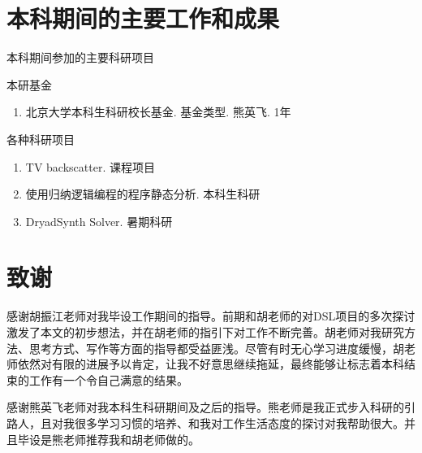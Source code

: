 \documentclass[UTF8,openany,AutoFakeBold,AutoFakeSlant,cs4size]{ctexbook}
\begin{document}
\clearpage
{}
{}
\small





\linespread{1}\selectfont
\normalsize
\chapter*{本科期间的主要工作和成果}

\noindent 本科期间参加的主要科研项目

\noindent 本研基金
\begin{enumerate}
	\item 北京大学本科生科研校长基金. 基金类型. 熊英飞. 1年
\end{enumerate}

\noindent 各种科研项目
\begin{enumerate}
	\item TV backscatter. 课程项目
	\item 使用归纳逻辑编程的程序静态分析. 本科生科研
	\item DryadSynth Solver. 暑期科研
\end{enumerate}



{
	\fancyhf{}
	\fancyfoot[CO,CE]{~\thepage~}
	\renewcommand{\headrulewidth}{0.7pt}
	\renewcommand{\footrulewidth}{0pt}
}
\fancyhf{}
\fancyfoot[CO,CE]{~\thepage~}
\renewcommand{\headrulewidth}{0.7pt}
\renewcommand{\footrulewidth}{0pt}
\clearpage





\linespread{1.5}\selectfont
\normalsize
\chapter*{致谢}
感谢胡振江老师对我毕设工作期间的指导。前期和胡老师的对DSL项目的多次探讨激发了本文的初步想法，并在胡老师的指引下对工作不断完善。胡老师对我研究方法、思考方式、写作等方面的指导都受益匪浅。尽管有时无心学习进度缓慢，胡老师依然对有限的进展予以肯定，让我不好意思继续拖延，最终能够让标志着本科结束的工作有一个令自己满意的结果。

感谢熊英飞老师对我本科生科研期间及之后的指导。熊老师是我正式步入科研的引路人，且对我很多学习习惯的培养、和我对工作生活态度的探讨对我帮助很大。并且毕设是熊老师推荐我和胡老师做的。
\end{document}
